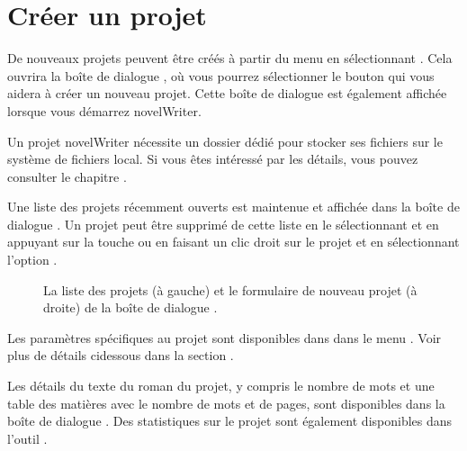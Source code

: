 \documentclass[a4paper,11pt,french]{sphinxmanual}
\begin{document}
\section{Créer un projet}
\label{\detokenize{project_overview:creating-project}}\label{\detokenize{project_overview:a-proj-new}}
\sphinxAtStartPar
De nouveaux projets peuvent être créés à partir du menu  en sélectionnant . Cela ouvrira la boîte de dialogue , où vous pourrez sélectionner le bouton  qui vous aidera à créer un nouveau projet. Cette boîte de dialogue est également affichée lorsque vous démarrez novelWriter.

\sphinxAtStartPar
Un projet novelWriter nécessite un dossier dédié pour stocker ses fichiers sur le système de fichiers local. Si vous êtes intéressé par les détails, vous pouvez consulter le chapitre {\hyperref[\detokenize{tech_storage:a-storage}]{}}.

\sphinxAtStartPar
Une liste des projets récemment ouverts est maintenue et affichée dans la boîte de dialogue . Un projet peut être supprimé de cette liste en le sélectionnant et en appuyant sur la touche  ou en faisant un clic droit sur le projet et en sélectionnant l’option .

\begin{figure}[htbp]
\centering
\capstart

\noindent{}
\caption{La liste des projets (à gauche) et le formulaire de nouveau projet (à droite) de la boîte de dialogue .}\label{\detokenize{project_overview:id1}}\end{figure}

\sphinxAtStartPar
Les paramètres spécifiques au projet sont disponibles dans  dans le menu . Voir plus de détails ci\sphinxhyphen{}dessous dans la section {\hyperref[\detokenize{project_overview:a-proj-settings}]{}}.

\sphinxAtStartPar
Les détails du texte du roman du projet, y compris le nombre de mots et une table des matières avec le nombre de mots et de pages, sont disponibles dans la boîte de dialogue . Des statistiques sur le projet sont également disponibles dans l’outil .
\end{document}
